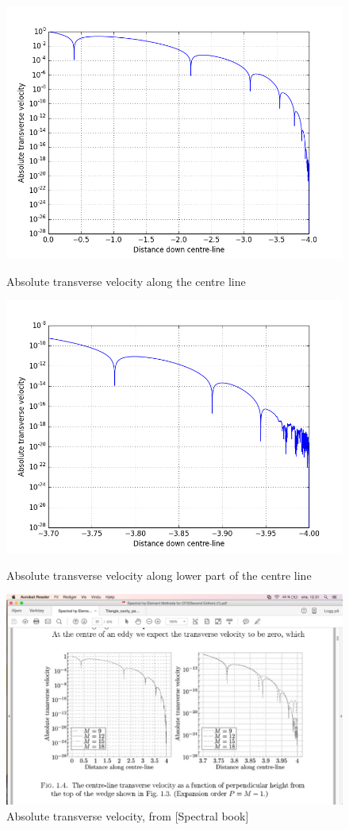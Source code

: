\documentclass[a4paper,norsk]{article}
\begin{document}
\begin{figure}
    \centering
    \includegraphics[trim = 0mm 0mm 0mm 0mm, clip, scale=0.4]{eddy_plot_1.png}
    \caption{Absolute transverse velocity along the centre line}
    \includegraphics[trim = 0mm 0mm 0mm 0mm, clip, scale=0.4]{eddy_plot_2.png}
    \caption{Absolute transverse velocity along lower part of the centre line}
    \includegraphics[trim = 50mm 10mm 10mm 70mm, clip, scale=0.4]{Spectral_eddy_plot.png}
    \caption{Absolute transverse velocity, from [Spectral book]}
    \label{fig:awesome_image}
\end{figure}
\newline
\end{document}
